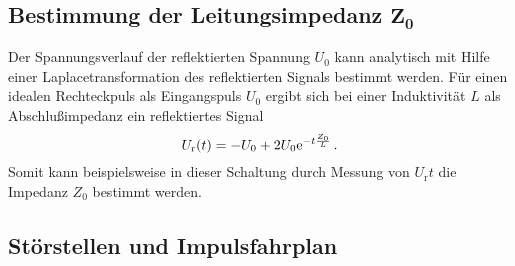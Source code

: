 \subsection%
    [Bestimmung der Leitungsimpedanz $Z_0$]%
    {Bestimmung der Leitungsimpedanz $\mathbf{Z_0}$} %
\label{sub:impedanz}
Der Spannungsverlauf der reflektierten Spannung $U_0$ kann analytisch mit
Hilfe einer Laplacetransformation des reflektierten Signals bestimmt werden.
Für einen idealen Rechteckpuls als Eingangspuls $U_0$ ergibt sich bei einer
Induktivität $L$ als Abschlußimpedanz ein reflektiertes Signal
\begin{equation*}
    U_\text{r}(t) = - U_0 + 2U_0\mathrm{e}^{-t \frac{Z_0}{L}}\,.
\end{equation*}
Somit kann beispielsweise in dieser Schaltung durch Messung von $U_\text{r}{t}$
die Impedanz $Z_0$ bestimmt werden.

\subsection{Störstellen und Impulsfahrplan} %
\label{sub:impulsfahrplan}

